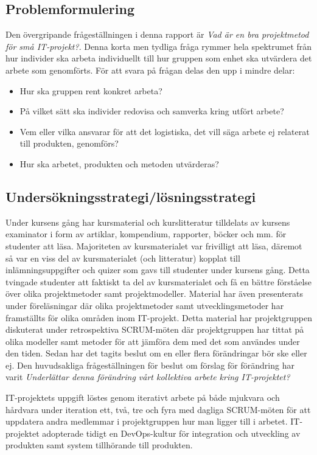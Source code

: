 \documentclass[conference]{IEEEtran}
\begin{document}
\subsection{Problemformulering}
Den övergripande frågeställningen i denna rapport är \textit{Vad är en bra projektmetod för små IT-projekt?}. Denna korta men tydliga fråga rymmer hela spektrumet från
hur individer ska arbeta individuellt till hur gruppen som enhet ska utvärdera det arbete som genomförts. För att svara på frågan delas den upp i mindre delar:
\begin{itemize}
    \item Hur ska gruppen rent konkret arbeta?
    \item På vilket sätt ska individer redovisa och samverka kring utfört arbete?
    \item Vem eller vilka ansvarar för att det logistiska, det vill säga arbete ej relaterat till produkten, genomförs?
    \item Hur ska arbetet, produkten och metoden utvärderas?
\end{itemize}

\subsection{Undersökningsstrategi/lösningsstrategi}
Under kursens gång har kursmaterial och kurslitteratur tilldelats av kursens examinator i form av artiklar, kompendium, rapporter, böcker och mm. för studenter att 
läsa. Majoriteten av kursmaterialet var frivilligt att läsa, däremot så var en viss del av kursmaterialet (och litteratur) kopplat till inlämningsuppgifter och 
quizer som gavs till studenter under kursens gång. Detta tvingade studenter att faktiskt ta del av kursmaterialet och få en bättre förståelse över olika 
projektmetoder samt projektmodeller. Material har även presenterats under föreläsningar där olika projektmetoder samt utvecklingsmetoder har framställts för olika 
områden inom IT-projekt. Detta material har projektgruppen diskuterat under retrospektiva SCRUM-möten där projektgruppen har tittat på olika modeller samt metoder 
för att jämföra dem med det som användes under den tiden. Sedan har det tagits beslut om en eller flera förändringar bör ske eller ej. Den huvudsakliga 
frågeställningen för beslut om förslag för förändring har varit \textit{Underlättar denna förändring vårt kollektiva arbete kring IT-projektet?}

IT-projektets uppgift löstes genom iterativt arbete på både mjukvara och hårdvara under iteration ett, två, tre och fyra med dagliga SCRUM-möten för att uppdatera 
andra medlemmar i projektgruppen hur man ligger till i arbetet. IT-projektet adopterade tidigt en DevOps-kultur för  integration och utveckling av produkten samt 
system tillhörande till produkten.
\end{document}
